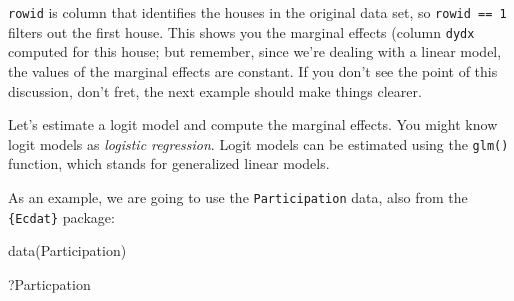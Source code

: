 \documentclass[
]{article}
\newenvironment{Shaded}{\begin{snugshade}}{\end{snugshade}}
\newcommand{\FunctionTok}[1]{\textcolor[rgb]{0.00,0.00,0.00}{#1}}
\newcommand{\NormalTok}[1]{#1}
\begin{document}
\texttt{rowid} is column that identifies the houses in the original data set, so \texttt{rowid\ ==\ 1} filters out
the first house. This shows you the marginal effects (column \texttt{dydx} computed for this house; but
remember, since we're dealing with a linear model, the values of the marginal effects are constant.
If you don't see the point of this discussion, don't fret, the next example should make things
clearer.

Let's estimate a logit model and compute the marginal effects. You might know logit models as
\emph{logistic regression}. Logit models can be estimated using the \texttt{glm()} function, which stands for
generalized linear models.

As an example, we are going to use the \texttt{Participation} data, also from the \texttt{\{Ecdat\}} package:

\begin{Shaded}
\begin{Highlighting}[]
\FunctionTok{data}\NormalTok{(Participation)}
\end{Highlighting}
\end{Shaded}

\begin{Shaded}
\begin{Highlighting}[]
\NormalTok{?Particpation}
\end{Highlighting}
\end{Shaded}
\end{document}
